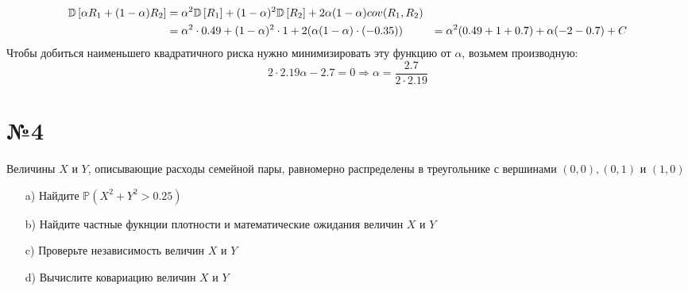 \documentclass{article}
\begin{document}
\begin{enumerate}
    \begin{equation*}
        \begin{aligned}
            \mathbb{D}\left[\alpha R_1+(1-\alpha)R_2\right]&=\alpha^2\mathbb{D}\left[R_1\right]+(1-\alpha)^2\mathbb{D}\left[R_2\right]+2\alpha(1-\alpha)cov(R_1,R_2)\\
            &=\alpha^2\cdot0.49+(1-\alpha)^2\cdot 1+2(\alpha(1-\alpha)\cdot(-0.35))
            &=\alpha^2(0.49+1+0.7)+\alpha(-2-0.7)+C
        \end{aligned}
    \end{equation*}
    Чтобы добиться наименьшего квадратичного риска нужно минимизировать эту функцию от $\alpha$, возьмем производную:
    \begin{equation*}
        2\cdot2.19\alpha-2.7=0\Longrightarrow\alpha=\frac{2.7}{2\cdot2.19}
    \end{equation*}
\end{enumerate}



\newpage
\section*{№4}
\begin{tcolorbox}[colback=blue!20!white, colframe=black!100!black]
    Величины $X$ и $Y$, описывающие расходы семейной пары, равномерно распределены в треугольнике с вершинами $(0,0),(0,1)$ и $(1,0)$

    \begin{itemize}
        \item[a)] Найдите $\mathbb{P}\left(X^2+Y^2>0.25\right)$
        \item[b)] Найдите частные фукнции плотности и математические ожидания величин $X$ и $Y$
        \item[c)] Проверьте независимость величин $X$ и $Y$
        \item[d)] Вычислите ковариацию величин $X$ и $Y$  
    \end{itemize}
\end{tcolorbox}
\end{document}
